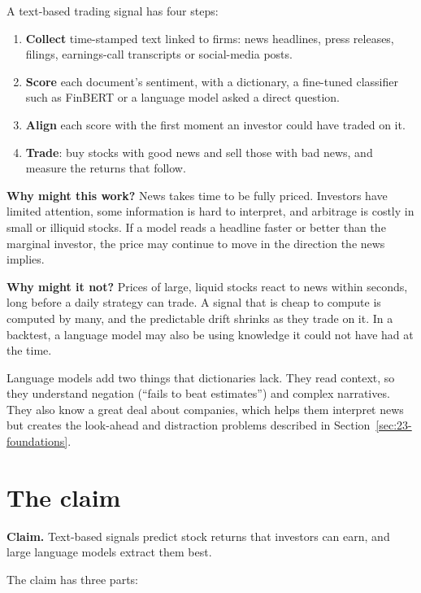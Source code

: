 A text-based trading signal has four steps:

\begin{enumerate}
  \item \textbf{Collect} time-stamped text linked to firms: news headlines, press releases, filings, earnings-call transcripts or social-media posts.
  \item \textbf{Score} each document's sentiment, with a dictionary, a fine-tuned classifier such as FinBERT or a language model asked a direct question.
  \item \textbf{Align} each score with the first moment an investor could have traded on it.
  \item \textbf{Trade}: buy stocks with good news and sell those with bad news, and measure the returns that follow.
\end{enumerate}

\textbf{Why might this work?} News takes time to be fully priced. Investors have limited attention, some information is hard to interpret, and arbitrage is costly in small or illiquid stocks. If a model reads a headline faster or better than the marginal investor, the price may continue to move in the direction the news implies.

\textbf{Why might it not?} Prices of large, liquid stocks react to news within seconds, long before a daily strategy can trade. A signal that is cheap to compute is computed by many, and the predictable drift shrinks as they trade on it. In a backtest, a language model may also be using knowledge it could not have had at the time.

Language models add two things that dictionaries lack. They read context, so they understand negation (``fails to beat estimates'') and complex narratives. They also know a great deal about companies, which helps them interpret news but creates the look-ahead and distraction problems described in Section~\ref{sec:23-foundations}.

\section{The claim}
\label{sec:23-claim}

\begin{callout}
\textbf{Claim.} Text-based signals predict stock returns that investors can earn, and large language models extract them best.
\end{callout}

The claim has three parts:

